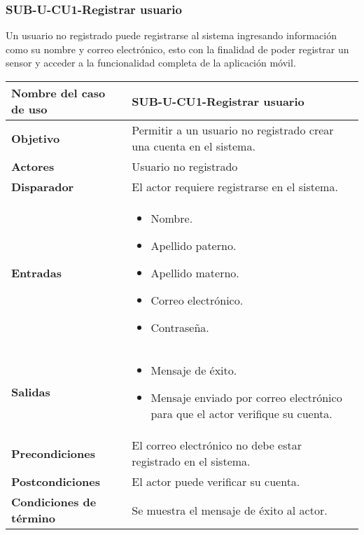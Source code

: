 \subsubsection{SUB-U-CU1-Registrar usuario}\label{SUB-U-CU1}
Un usuario no registrado puede registrarse al sistema ingresando información como su nombre y correo electrónico, esto con la finalidad de poder registrar un sensor y acceder a la funcionalidad completa de la aplicación móvil.

\begin{longtable}{|J{5cm}|J{10.3cm}|}
	\hline
	\textbf{Nombre del caso de uso} &
		SUB-U-CU1-Registrar usuario \\ \hline
	\textbf{Objetivo} &
		Permitir a un usuario no registrado crear una cuenta en el sistema. \\ \hline
	\textbf{Actores} &
		Usuario no registrado \\ \hline 
	\textbf{Disparador} & 
		El actor requiere registrarse en el sistema. \\ \hline 
	\textbf{Entradas} & 
		\begin{itemize}
				\item Nombre.
				\item Apellido paterno.
				\item Apellido materno.
				\item Correo electrónico.
				\item Contraseña.
		\end{itemize}\\ \hline 
	\textbf{Salidas} & 
		\begin{itemize}
			\item Mensaje de éxito.
			\item Mensaje enviado por correo electrónico para que el actor verifique su cuenta.
		\end{itemize} \\ \hline
	\textbf{Precondiciones} &
		El correo electrónico no debe estar registrado en el sistema.\\ \hline
	\textbf{Postcondiciones} & El actor puede verificar su cuenta.
		\\ \hline
	\textbf{Condiciones de término} & Se muestra el mensaje de éxito al actor.

\end{longtable}
